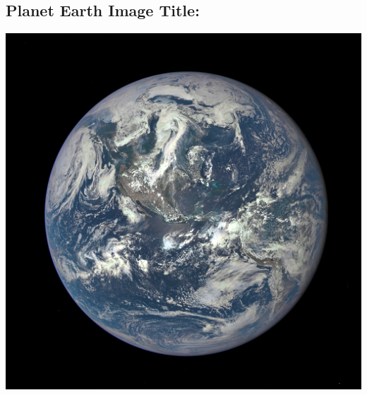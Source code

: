 \documentclass[12pt]{article} %
\begin{document}
\begin{flushleft}
\section*{Planet Earth Image Title:}
\includegraphics{earth.png} %
\end{flushleft}
\end{document}
